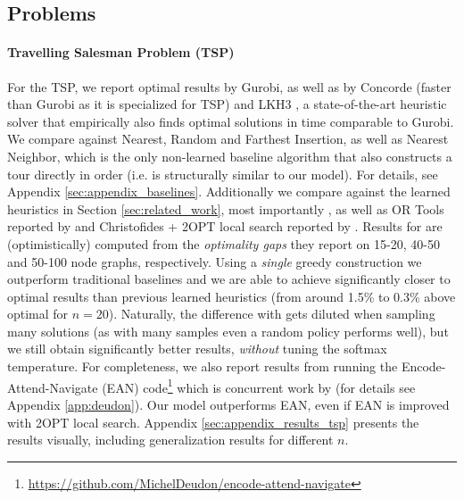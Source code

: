 \subsection{Problems}

\paragraph{Travelling Salesman Problem (TSP)}
For the TSP, we report optimal results by Gurobi, as well as by Concorde \citep{concorde} (faster than Gurobi as it is specialized for TSP) and LKH3 \citep{helsgaun2017extension}, a state-of-the-art heuristic solver that empirically also finds optimal solutions in time comparable to Gurobi. We compare against Nearest, Random and Farthest Insertion, as well as Nearest Neighbor, which is the only non-learned baseline algorithm that also constructs a tour directly in order (i.e. is structurally similar to our model). For details, see Appendix \ref{sec:appendix_baselines}. Additionally we compare against the learned heuristics in Section \ref{sec:related_work}, most importantly \citet{bello2016neural}, as well as OR Tools reported by \citet{bello2016neural} and Christofides + 2OPT local search reported by \citet{vinyals2015pointer}. Results for \citet{dai2017learning} are (optimistically) computed from the \emph{optimality gaps} they report on 15-20, 40-50 and 50-100 node graphs, respectively. Using a \emph{single} greedy construction we outperform traditional baselines and we are able to achieve significantly closer to optimal results than previous learned heuristics (from around 1.5\% to 0.3\% above optimal for $n=20$). Naturally, the difference with \citet{bello2016neural} gets diluted when sampling many solutions (as with many samples even a random policy performs well), but we still obtain significantly better results, \emph{without} tuning the softmax temperature. For completeness, we also report results from running the Encode-Attend-Navigate (EAN) code\footnote{\url{https://github.com/MichelDeudon/encode-attend-navigate}} which is concurrent work by \citet{deudon2018learning} (for details see Appendix \ref{app:deudon}). Our model outperforms EAN, even if EAN is improved with 2OPT local search. Appendix \ref{sec:appendix_results_tsp} presents the results visually, including generalization results for different $n$.

